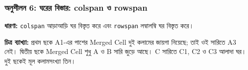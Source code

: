 \par\noindent\subsubsection{অনুশীলন 6: ঘরের বিস্তার: colspan ও rowspan}\par\smallskip\textbf{ধারণা:}
\texttt{colspan} আড়াআড়ি ঘর বিস্তৃত করে এবং \texttt{rowspan} লম্বালম্বি ঘর বিস্তৃত করে।


\noindent
\textbf{চিত্র ব্যাখ্যা:} 
প্রথম ছকে A1-এর পাশের Merged Cell দুই কলামের জায়গা নিয়েছে; তাই ওই সারিতে A3 নেই। দ্বিতীয় ছকে Merged Cell শুধু A ও B সারি জুড়ে আছে। C সারিতে C1, C2 ও C3 আলাদা ঘর। দুই ছকেই মূল কলামসংখ্যা তিন।





